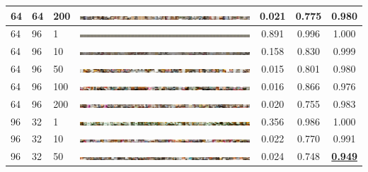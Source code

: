 \documentclass[a4paper]{article}
\begin{document}
\begin{table}[h!]
\begin{center}
{\begin{tabular}{lllcccc}
      64 & 64 & 200 & \includegraphics[width=\textwidth,trim={1536px 0 0 0},clip]{figures/bedrooms_g64_d64_ep200_generator.jpg}  & 0.021 & 0.775 & 0.980\\
      \hline
      64 & 96 & 1   & \includegraphics[width=\textwidth,trim={1536px 0 0 0},clip]{figures/bedrooms_g64_d96_ep1_generator.jpg}    & 0.891 & 0.996 & 1.000\\
      64 & 96 & 10  & \includegraphics[width=\textwidth,trim={1536px 0 0 0},clip]{figures/bedrooms_g64_d96_ep10_generator.jpg}   & 0.158 & 0.830 & 0.999\\
      64 & 96 & 50  & \includegraphics[width=\textwidth,trim={1536px 0 0 0},clip]{figures/bedrooms_g64_d96_ep50_generator.jpg}   & 0.015 & 0.801 & 0.980\\
      64 & 96 & 100 & \includegraphics[width=\textwidth,trim={1536px 0 0 0},clip]{figures/bedrooms_g64_d96_ep100_generator.jpg}  & 0.016 & 0.866 & 0.976\\
      64 & 96 & 200 & \includegraphics[width=\textwidth,trim={1536px 0 0 0},clip]{figures/bedrooms_g64_d96_ep200_generator.jpg}  & 0.020 & 0.755 & 0.983\\
      \hline
      96 & 32 & 1   & \includegraphics[width=\textwidth,trim={1536px 0 0 0},clip]{figures/bedrooms_g96_d32_ep1_generator.jpg}    & 0.356 & 0.986 & 1.000\\
      96 & 32 & 10  & \includegraphics[width=\textwidth,trim={1536px 0 0 0},clip]{figures/bedrooms_g96_d32_ep10_generator.jpg}   & 0.022 & 0.770 & 0.991\\
      96 & 32 & 50  & \includegraphics[width=\textwidth,trim={1536px 0 0 0},clip]{figures/bedrooms_g96_d32_ep50_generator.jpg}   & 0.024 & 0.748 & \underline{\bf 0.949}\\

\end{tabular}}
\end{center}
\end{table}
\end{document}
